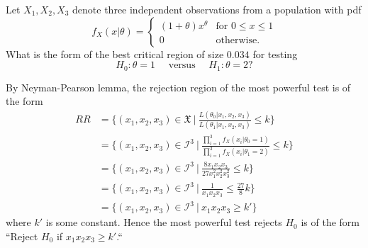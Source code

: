 \begin{example}
    Let $X_1, X_2, X_3$ denote three independent observations from a population with pdf
    \[
        f_X(x|\theta) = \begin{cases}
            (1 + \theta) x^{\theta} & \text{for } 0\leq x \leq 1\\
            0 & \text{otherwise}.
        \end{cases}
    \]
    What is the form of the best critical region of size $0.034$ for testing 
    \[
        H_0 : \theta = 1 \quad \text{ versus } \quad H_1 : \theta = 2?
    \]
\end{example}
\begin{solution}
    By Neyman-Pearson lemma, the rejection region of the most powerful test is of the form
    \begin{align*}
        RR &= \{ (x_1, x_2, x_3) \in \mathfrak{X} \> \bigg \vert \> \frac{L(\theta_0 | x_1, x_2, x_3)}{L(\theta_1 | x_1, x_2, x_3)} \leq k \}\\
        &= \{ (x_1, x_2, x_3) \in \mathcal{I}^3 \> \bigg \vert \> \frac{\prod_{i=1}^{3} f_X(x_i|\theta_0 = 1)}{\prod_{i=1}^{3} f_X(x_i|\theta_1 = 2)} \leq k \}\\
        &= \{ (x_1, x_2, x_3) \in \mathcal{I}^3 \> | \> \frac{8 x_1 x_2 x_3}{27 x^2_1 x^2_2 x^2_3} \leq k \}\\
        &= \{ (x_1, x_2, x_3) \in \mathcal{I}^3 \> | \> \frac{1}{x_1 x_2 x_3} \leq \frac{27}{8} k \}\\
        &= \{ (x_1, x_2, x_3) \in \mathcal{I}^3 \> | \> x_1 x_2 x_3 \geq k' \}
    \end{align*}
    where $k'$ is some constant. Hence the most powerful test rejects $H_0$ is of the form 
    ``Reject $H_0$ if $x_1 x_2 x_3 \geq k'$.``
    

\end{solution}
